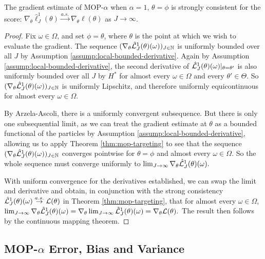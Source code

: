 \documentclass[11pt]{article}
\begin{document}
\begin{thm}
    The gradient estimate of MOP-$\alpha$ when $\alpha=1$, $\theta=\phi$ is strongly consistent for the score: $\nabla_\theta \hat\ell_J^1(\theta) \stackrel{a.s.}{\to} \nabla_\theta \ell(\theta)$ as $J \to \infty$.
    \label{thm:mop-grad-consistency}
\end{thm}
\begin{proof}
    Fix $\omega \in \Omega$, and set $\phi = \theta$, where $\theta$ is the point at which we wish to evaluate the gradient. The sequence $(\nabla_\theta \hat{\mathcal{L}}_J^1(\theta)(\omega))_{J \in \mathbb{N}}$ is uniformly bounded over all $J$ by Assumption \ref{assump:local-bounded-derivative}. Again by Assumption \ref{assump:local-bounded-derivative}, the second derivative of $\hat{\mathcal{L}}_J^1(\theta)(\omega)|_{\theta=\theta'}$ is also uniformly bounded over all $J$ by $H^*$ for almost every $\omega\in \Omega$ and every $\theta'\in \Theta$. So $(\nabla_\theta \hat{\mathcal{L}}_J^1(\theta)( \omega))_{J \in \mathbb{N}}$ is uniformly Lipschitz, and therefore uniformly equicontinuous for almost every $\omega \in \Omega$.

    By Arzela-Ascoli, there is a uniformly convergent subsequence. But there is only one subsequential limit, as we can treat the gradient estimate at $\theta$ as a bounded functional of the particles by Assumption \ref{assump:local-bounded-derivative}, allowing us to apply Theorem \ref{thm:mop-targeting} to see that the sequence $(\nabla_\theta \hat{\mathcal{L}}_J^1(\theta)(\omega))_{J \in \mathbb{N}}$ converges pointwise for $\theta=\phi$ and almost every $\omega \in \Omega$. So the whole sequence must converge uniformly to $\lim_{J \to \infty} \nabla_\theta \hat{\mathcal{L}}_J^1(\theta)(\omega).$ 
    
    With uniform convergence for the derivatives established, we can swap the limit and derivative and obtain, in conjunction with the strong consistency $\hat{\mathcal{L}}_J^1(\theta)(\omega) \stackrel{a.s.}{\to} \mathcal{L}(\theta)$ in Theorem \ref{thm:mop-targeting}, that for almost every $\omega \in \Omega$, 
    $\lim_{J \to \infty} \nabla_\theta \hat{\mathcal{L}}_J^1(\theta)(\omega) = \nabla_\theta \lim_{J \to \infty} \hat{\mathcal{L}}_J^1(\theta)(\omega) = \nabla_\theta \mathcal{L}(\theta).$
    The result then follows by the continuous mapping theorem. 
\end{proof}


\subsection{MOP-$\alpha$ Error, Bias and Variance}
\end{document}

